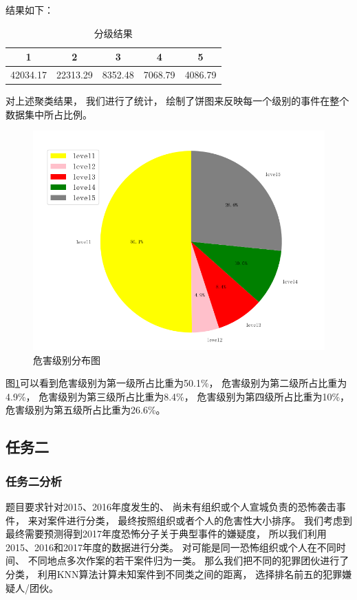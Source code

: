 \documentclass[bwprint]{gmcmthesis}
\begin{document}
结果如下：

\begin{table}
\centering
\caption{分级结果}
\begin{tabular}{|c|c|c|c|c|}
  \hline
          1    &    2       &   3      &     4   &   5  \\
  \hline
    42034.17   &  22313.29  &  8352.48 &  7068.79 & 4086.79\\
  \hline
\end{tabular}
\end{table}

对上述聚类结果，
我们进行了统计，
绘制了饼图来反映每一个级别的事件在整个数据集中所占比例。

\begin{figure}[htbp]
\centering
  \includegraphics[width=.5\textwidth]{figures//img//Figure12.png}
  \caption{危害级别分布图}
  \label{tab:聚类结果}
\end{figure}

图\ref{tab:聚类结果}可以看到危害级别为第一级所占比重为50.1\%，
危害级别为第二级所占比重为4.9\%，
危害级别为第三级所占比重为8.4\%，
危害级别为第四级所占比重为10\%，
危害级别为第五级所占比重为26.6\%。


\subsection{任务二}

\subsubsection{任务二分析}

题目要求针对2015、2016年度发生的、
尚未有组织或个人宣城负责的恐怖袭击事件，
来对案件进行分类，
最终按照组织或者个人的危害性大小排序。
我们考虑到最终需要预测得到2017年度恐怖分子关于典型事件的嫌疑度，
所以我们利用2015、2016和2017年度的数据进行分类。
对可能是同一恐怖组织或个人在不同时间、
不同地点多次作案的若干案件归为一类。
那么我们把不同的犯罪团伙进行了分类，
利用KNN算法计算未知案件到不同类之间的距离，
选择排名前五的犯罪嫌疑人/团伙。
\end{document}
